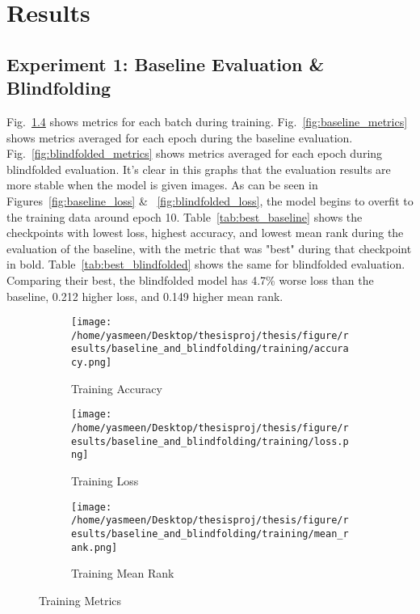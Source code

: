 \chapter{Results}
\section{Experiment 1: Baseline Evaluation \& Blindfolding}
Fig.~\ref{fig:training_metrics} shows metrics for each batch during training. Fig.~\ref{fig:baseline_metrics} shows metrics averaged for each epoch during the baseline evaluation. Fig.~\ref{fig:blindfolded_metrics} shows metrics averaged for each epoch during blindfolded evaluation. It's clear in this graphs that the evaluation results are more stable when the model is given images. As can be seen in Figures~\ref{fig:baseline_loss} \& ~\ref{fig:blindfolded_loss}, the model begins to overfit to the training data around epoch 10. 
Table~\ref{tab:best_baseline} shows the checkpoints with lowest loss, highest accuracy, and lowest mean rank during the evaluation of the baseline, with the metric that was "best" during that checkpoint in bold. Table~\ref{tab:best_blindfolded} shows the same for blindfolded evaluation. Comparing their best, the blindfolded model has 4.7\% worse loss than the baseline, 0.212 higher loss, and 0.149 higher mean rank. 

\begin{figure}
     \centering
     \begin{subfigure}[b]{0.3\textwidth}
         \centering
         \texttt{[image: /home/yasmeen/Desktop/thesisproj/thesis/figure/results/baseline\_and\_blindfolding/training/accuracy.png]}
         \caption{Training Accuracy}
         \label{fig:training_accuracy}
     \end{subfigure}
     \hfill
     \begin{subfigure}[b]{0.3\textwidth}
         \centering
         \texttt{[image: /home/yasmeen/Desktop/thesisproj/thesis/figure/results/baseline\_and\_blindfolding/training/loss.png]}
         \caption{Training Loss}
         \label{fig:training_loss}
     \end{subfigure}
     \hfill
     \begin{subfigure}[b]{0.3\textwidth}
         \centering
         \texttt{[image: /home/yasmeen/Desktop/thesisproj/thesis/figure/results/baseline\_and\_blindfolding/training/mean\_rank.png]}
         \caption{Training Mean Rank}
         \label{fig:training_mean_rank}
     \end{subfigure}
     \caption{Training Metrics}
     \label{fig:training_metrics}
\end{figure}

